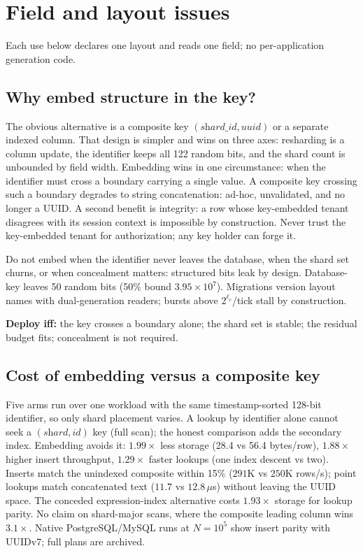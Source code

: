 \documentclass{svproc}
\begin{document}
\section{Field and layout issues}
\label{sec:applications}
Each use below declares one layout and reads one field; no per-application generation code.

\subsection{Why embed structure in the key?}
\label{sec:why-embed}
The obvious alternative is a composite key
$(\textit{shard\_id}, \textit{uuid})$ or a separate indexed column. That
design is simpler and wins on three axes: resharding is a column update,
the identifier keeps all 122 random bits, and the shard count is unbounded
by field width. Embedding wins in one circumstance: when the identifier must
cross a boundary carrying a single value. A composite key crossing such a
boundary degrades to string concatenation: ad-hoc, unvalidated, and no longer
a UUID. A second benefit is integrity: a row whose key-embedded tenant
disagrees with its session context is impossible by construction. Never trust
the key-embedded tenant for authorization; any key holder can forge it.

Do not embed when the identifier never leaves the database, when the shard set churns, or when concealment matters: structured bits leak by design. Database-key leaves 50 random bits (50\% bound $3.95\times10^7$). Migrations version layout names with dual-generation readers; bursts above $2^{\ell_c}$/tick stall by construction.

\noindent\textbf{Deploy iff:} the key crosses a boundary alone; the shard set is stable; the residual budget fits; concealment is not required.

\subsection{Cost of embedding versus a composite key}
\label{sec:composite-bench}
Five arms run over one workload with the same timestamp-sorted 128-bit identifier, so only shard placement varies. A lookup by identifier alone cannot seek a $(\textit{shard},\textit{id})$ key (full scan); the honest comparison adds the secondary index. Embedding avoids it: $1.99\times$ less storage (28.4 vs 56.4 bytes/row), $1.88\times$ higher insert throughput, $1.29\times$ faster lookups (one index descent vs two). Inserts match the unindexed composite within 15\% ($291$K vs $250$K rows/s); point lookups match concatenated text ($11.7$ vs $12.8\,\mu$s) without leaving the UUID space. The conceded expression-index alternative costs $1.93\times$ storage for lookup parity. No claim on shard-major scans, where the composite leading column wins $3.1\times$. Native PostgreSQL/MySQL runs at $N=10^5$ show insert parity with UUIDv7; full plans are archived.
\end{document}
